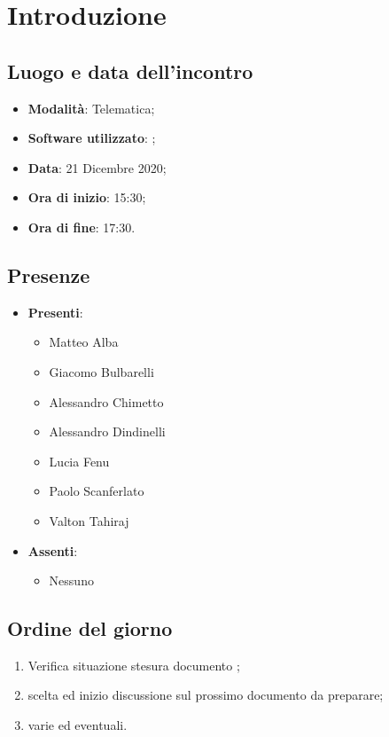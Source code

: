 \documentclass[]{article}
\begin{document}
	
	
	
	\newpage
	
	\section{Introduzione}
		\subsection{Luogo e data dell'incontro}
		\begin{itemize}
			\item \textbf{Modalità}: Telematica;
			\item \textbf{Software utilizzato}: ;
			\item \textbf{Data}: 21 Dicembre 2020;
			\item \textbf{Ora di inizio}: 15:30;
			\item \textbf{Ora di fine}: 17:30.
		\end{itemize}

		\subsection{Presenze}
		\begin{itemize}
			\item \textbf{Presenti}:
		\begin{itemize}
			\item Matteo Alba
			\item Giacomo Bulbarelli
			\item Alessandro Chimetto
			\item Alessandro Dindinelli
			\item Lucia Fenu
			\item Paolo Scanferlato
			\item Valton Tahiraj
		\end{itemize}
			\item \textbf{Assenti}:
			\begin{itemize}
				\item Nessuno
			\end{itemize}
		\end{itemize}
	
		\subsection{Ordine del giorno}
		\begin{enumerate}
			\item Verifica situazione stesura documento ;
			\item scelta ed inizio discussione sul prossimo documento da preparare;
			\item varie ed eventuali.
		\end{enumerate}
	
\end{document}
